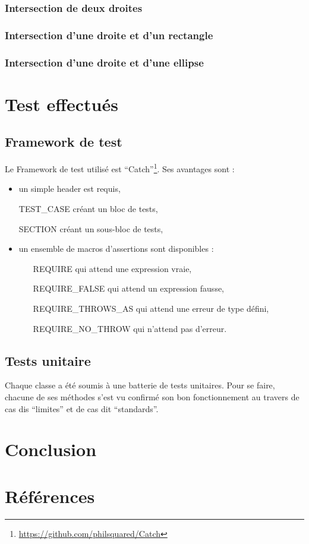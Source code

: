 \documentclass[a4paper,11pt]{report}
\begin{document}
\subsection[Deux droites]{Intersection de deux droites}
\subsection[Droite et rectangle]{Intersection d'une droite et d'un rectangle}
\subsection[Droite et ellipse]{Intersection d'une droite et d'une ellipse}



\chapter{Test effectués}
\section{Framework de test}
Le Framework de test utilisé est
``Catch''\footnote{\url{https://github.com/philsquared/Catch}}. Ses avantages
sont :
\begin{itemize}
	\item un simple header est requis,
	\item[TEST\_CASE] créant un bloc de tests,
	\item[SECTION] créant un sous-bloc de tests,
	\item un ensemble de macros d'assertions sont disponibles :
		\begin{itemize}
			\item[REQUIRE] qui attend une expression vraie,
			\item[REQUIRE\_FALSE] qui attend un expression fausse,
			\item[REQUIRE\_THROWS\_AS] qui attend une erreur de type défini,
			\item[REQUIRE\_NO\_THROW] qui n'attend pas d'erreur.
		\end{itemize}
\end{itemize} 
\section{Tests unitaire}
Chaque classe a été soumis à une batterie de tests unitaires. Pour se faire,
chacune de ses méthodes s'est vu confirmé son bon fonctionnement au travers de
cas dis ``limites'' et de cas dit ``standards''. \\




\chapter{Conclusion}


\appendix


\chapter{Références}
\end{document}
